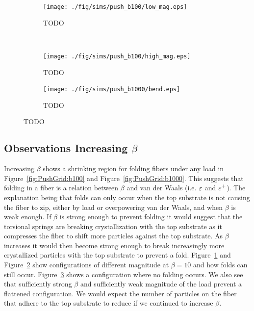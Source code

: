 	\begin{figure}
		\centering
		\begin{subfigure}{.5\textwidth}
			\centering
			\texttt{[image: ./fig/sims/push\_b100/low\_mag.eps]}
			\caption{TODO \label{subfig:push_b100_low_mag}}
		\end{subfigure}%
		~
		\begin{subfigure}{.5\textwidth}
			\centering
			\texttt{[image: ./fig/sims/push\_b100/high\_mag.eps]}
			\caption{TODO \label{subfig:push_b100_high_mag}}
		\end{subfigure}

		\begin{subfigure}{.5\textwidth}
			\centering
			\texttt{[image: ./fig/sims/push\_b1000/bend.eps]}
			\caption{TODO \label{subfig:push_b1000_bend}}
		\end{subfigure}		
		\caption{TODO\label{fig:push_bending}}	
	\end{figure}

\subsection{Observations Increasing $\beta$}

Increasing $\beta$ shows a shrinking region for folding fibers under any load in Figure~\ref{fig:PushGrid:b100} and Figure~\ref{fig:PushGrid:b1000}. This suggests that folding in a fiber is a relation between $\beta$ and van der Waals (i.e. $\varepsilon$ and $\varepsilon^+$). The explanation being that folds can only occur when the top substrate is not causing the fiber to zip, either by load or overpowering van der Waals, and when $\beta$ is weak enough. If $\beta$ is strong enough to prevent folding it would suggest that the torsional springs are breaking crystallization with the top substrate as it compresses the fiber to shift more particles against the top substrate. As $\beta$ increases it would then become strong enough to break increasingly more crystallized particles with the top substrate to prevent a fold. Figure~\ref{subfig:push_b100_low_mag} and Figure~\ref{subfig:push_b100_high_mag} show configurations of different magnitude at $\beta = 10$ and how folds can still occur. Figure~\ref{subfig:push_b1000_bend} shows a configuration where no folding occurs. We also see that sufficiently strong $\beta$ and sufficiently weak magnitude of the load prevent a flattened configuration. We would expect the number of particles on the fiber that adhere to the top substrate to reduce if we continued to increase $\beta$. 

